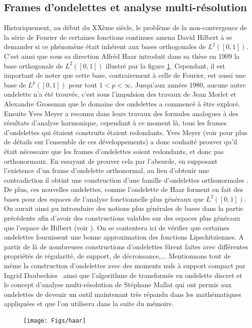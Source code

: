 	\subsection{Frames d'ondelettes et analyse multi-résolution}\label{sec:frameondelette}
Historiquement, au début du XXème siècle, le problème de la non-convergence de la série de Fourier de certaines fonctions continues amena David Hilbert à se demander si ce phénomène était inhérent aux bases orthogonales de $L^2([0,1])$.
C'est ainsi que sous sa direction Alfréd Haar introduit dans sa thèse \cite{haar} en 1909 la base orthogonale de $L^2([0,1])$ illustré par la figure \ref{fig:haar}.
Cependant, il est important de noter que cette base, contrairement à celle de Fourier, est aussi une base de $L^p([0,1])$ pour tout $1<p<\infty$.
Jusqu'aux années 1980, aucune autre ondelette n'a été trouvée, c'est sous l'impulsion des travaux de Jean Morlet et Alexandre Grossman que le domaine des ondelettes a commencé à être exploré.
Ensuite Yves Meyer a reconnu dans leurs travaux des formules analogues à des résultats d'analyse harmonique, cependant à ce moment là, tous les frames d'ondelettes qui étaient construits étaient redondants.
Yves Meyer (voir \cite{daubpers} pour plus de détails sur l'ensemble de ces développements) a donc souhaité prouver qu'il était nécessaire que les frames d'ondelettes soient redondants, et donc pas orthonormaux.
En essayant de prouver cela par l'absurde, en supposant l'existence d'un frame d'ondelette orthonormal, au lieu d'obtenir une contradiction il obtint une construction d'une famille d'ondelettes orthonormales \cite{meyer}.
De plus, ces nouvelles ondelettes, comme l'ondelette de Haar forment en fait des bases pour des espaces de l'analyse fonctionnelle plus généraux que $L^2([0,1])$.
On aurait ainsi pu introuduire des notions plus générales de bases dans la partie précédente afin d'avoir des constructions valables sur des espaces plus généraux que l'espace de Hilbert (voir \cite{jaffardondelettes}).
On se contentera ici de vérifier que certaines ondelettes fournissent une bonne approximation des fonctions Lipschitziennes.
\newline
A partir de là de nombreuses constructions d'ondelettes fûrent faites avec différentes propriétés de régularité, de support, de décroissance,... 
Mentionnons tout de même la construction d'ondelettes avec des moments nuls à support compact par Ingrid Daubechies \cite{daubbook} ainsi que l'algorithme de transformée en ondelette discret et le concept d'analyse multi-résolution de Stéphane Mallat \cite{mallatbook} qui ont permis aux ondelettes de devenir un outil maintenant très répandu dans les mathématiques appliquées et que l'on utilisera dans la suite du mémoire.
\begin{figure}
	\centering
	\texttt{[image: Figs/haar]}
	\caption{}\label{fig:haar}
\end{figure}	


